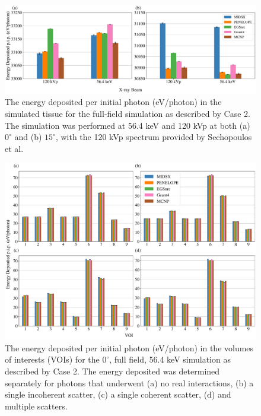 \documentclass[%
 aip,
cp,  %
 amsmath,amssymb,%
reprint,%
]{revtex4-2}
\begin{document}
\begin{figure}[H]
    \centering
	\includegraphics[width=1.0\textwidth]{../figures/radiography_body_dep_paper_ready.pdf}
	\caption{The energy deposited per initial photon (eV/photon) in the simulated tissue for the full-field simulation as described by Case 2. The simulation was performed at 56.4 keV and 120 kVp at both (a) $0^\circ$ and (b) $15^\circ$, with the 120 kVp spectrum provided by Sechopoulos et al.}
 	\label{figure:BDGraph}
\end{figure}

\begin{figure}[H]
    \centering
	\includegraphics[width=1.0\textwidth]{../figures/VOI_paper_ready.pdf}
	\caption{The energy deposited per initial photon (eV/photon) in the volumes of interests (VOIs) for the $0^\circ$, full field, 56.4 keV simulation as described by Case 2. The energy deposited was determined separately for photons that underwent (a) no real interactions, (b) a single incoherent scatter, (c) a single coherent scatter, (d) and multiple scatters.}
	\label{figure:VOIFFGraph}
\end{figure}
\end{document}
